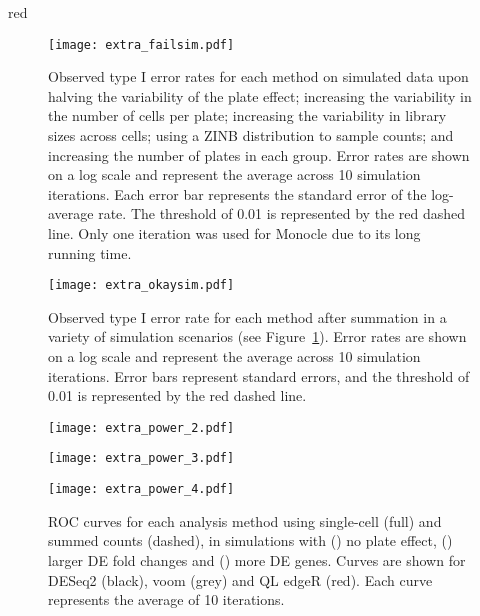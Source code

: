 \documentclass{article}
\begin{document}
\begin{color}{red}
\begin{figure}[p]
    \begin{center}
        \texttt{[image: extra\_failsim.pdf]}
    \end{center}
    \caption{    
        Observed type I error rates for each method on simulated data upon halving the variability of the plate effect; increasing the variability in the number of cells per plate; increasing the variability in library sizes across cells; using a ZINB distribution to sample counts; and increasing the number of plates in each group.
        Error rates are shown on a log scale and represent the average across 10 simulation iterations.
        Each error bar represents the standard error of the log-average rate.
        The threshold of 0.01 is represented by the red dashed line.
        Only one iteration was used for Monocle due to its long running time.
    }
    \label{fig:extrafail}
\end{figure}

\begin{figure}[p]
    \begin{center}
        \texttt{[image: extra\_okaysim.pdf]}
    \end{center}
    \caption{   
        Observed type I error rate for each method after summation in a variety of simulation scenarios (see Figure~\ref{fig:extrafail}).
        Error rates are shown on a log scale and represent the average across 10 simulation iterations.
        Error bars represent standard errors, and the threshold of 0.01 is represented by the red dashed line.
    }
\end{figure}

\begin{figure}[p]
    \begin{center}
    \begin{minipage}{0.32\textwidth}
        \texttt{[image: extra\_power\_2.pdf]}
        \subcaption[]{}
        \label{subfig:noplate}
    \end{minipage}
    \begin{minipage}{0.32\textwidth}
        \texttt{[image: extra\_power\_3.pdf]}
        \subcaption[]{}
        \label{subfig:bigfc}
    \end{minipage}
    \begin{minipage}{0.32\textwidth}
        \texttt{[image: extra\_power\_4.pdf]}
        \subcaption[]{}
        \label{subfig:morede}
    \end{minipage}
    \end{center}
    \caption{  
        ROC curves for each analysis method using single-cell (full) and summed counts (dashed), in simulations with () no plate effect, () larger DE fold changes and () more DE genes. 
        Curves are shown for DESeq2 (black), voom (grey) and QL edgeR (red).
        Each curve represents the average of 10 iterations.
    }
    \label{fig:altroc}
\end{figure}


\end{color}
\end{document}
